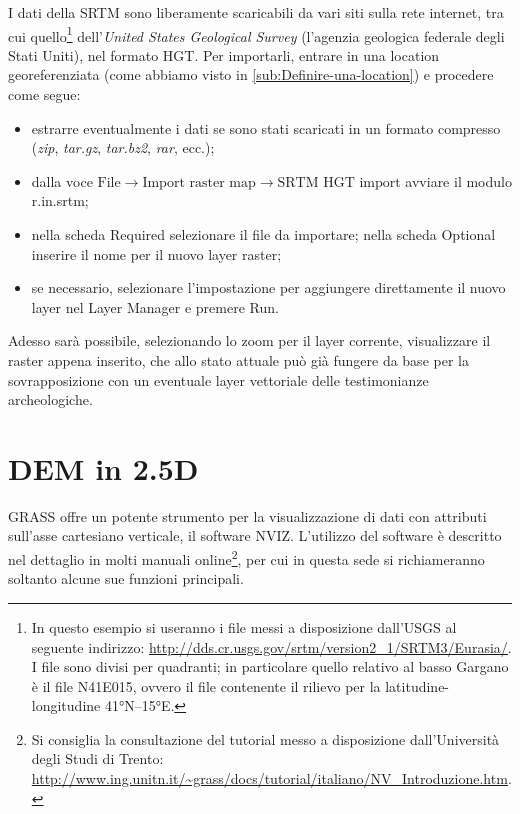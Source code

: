 	I dati della SRTM sono liberamente scaricabili da vari siti sulla rete internet, tra cui quello\footnote{In questo esempio si useranno i file messi a disposizione dall'USGS al seguente indirizzo: \url{http://dds.cr.usgs.gov/srtm/version2_1/SRTM3/Eurasia/}. I file sono divisi per quadranti; in particolare quello relativo al basso Gargano è il file \textsf{N41E015}, ovvero il file contenente il rilievo per la latitudine-longitudine 41\unit{\degree}N--15\unit{\degree}E.} dell'\emph{United States Geological Survey} (l'agenzia geologica federale degli Stati Uniti), nel formato HGT. Per importarli, entrare in una location georeferenziata (come abbiamo visto in \textsection\ref{sub:Definire-una-location}) e procedere come segue:
	
	\begin{itemize}
		\item estrarre eventualmente i dati se sono stati scaricati in un formato compresso (\emph{zip}, \emph{tar.gz}, \emph{tar.bz2}, \emph{rar}, ecc.);
		\item dalla voce \textsf{$\text{File}\rightarrow\text{Import raster map}\rightarrow\text{SRTM HGT import}$} avviare il modulo \textsf{r.in.srtm};
		\item nella scheda \textsf{Required} selezionare il file da importare; nella scheda \textsf{Optional} inserire il nome per il nuovo layer raster;
		\item se necessario, selezionare l'impostazione per aggiungere direttamente il nuovo layer nel Layer Manager e premere \textsf{Run}.
	\end{itemize}
	
	Adesso sarà possibile, selezionando lo zoom per il layer corrente, visualizzare il raster appena inserito, che allo stato attuale può già fungere da base per la sovrapposizione con un eventuale layer vettoriale delle testimonianze archeologiche.

\section{DEM in 2.5D}
	GRASS offre un potente strumento per la visualizzazione di dati con attributi sull'asse cartesiano verticale, il software NVIZ. L'utilizzo del software è descritto nel dettaglio in molti manuali online\footnote{Si consiglia la consultazione del tutorial messo a disposizione dall'Università degli Studi di Trento: \url{http://www.ing.unitn.it/~grass/docs/tutorial/italiano/NV_Introduzione.htm}.}, per cui in questa sede si richiameranno soltanto alcune sue funzioni principali.

